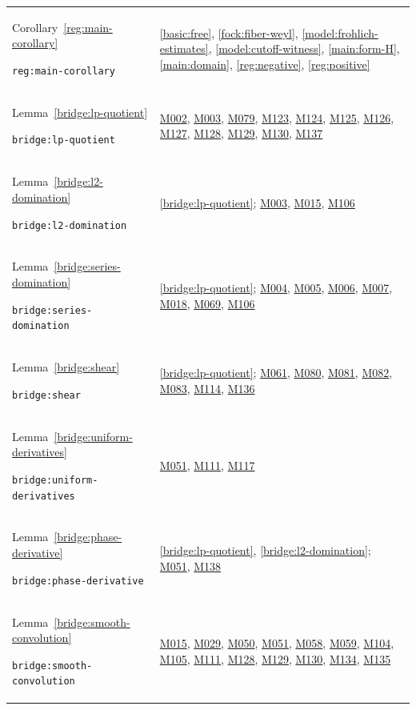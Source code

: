 \documentclass[11pt,a4paper]{article}
\theoremstyle{definition}
\theoremstyle{remark}
\begin{document}
\begin{longtable}{@{}p{}p{}@{}}
Corollary~\ref{reg:main-corollary}\par\nolinkurl{reg:main-corollary} & \ref{basic:free}, \ref{fock:fiber-weyl}, \ref{model:frohlich-estimates}, \ref{model:cutoff-witness}, \ref{main:form-H}, \ref{main:domain}, \ref{reg:negative}, \ref{reg:positive} \\[4pt]
Lemma~\ref{bridge:lp-quotient}\par\nolinkurl{bridge:lp-quotient} & \hyperref[base:M002]{M002}, \hyperref[base:M003]{M003}, \hyperref[base:M079]{M079}, \hyperref[base:M123]{M123}, \hyperref[base:M124]{M124}, \hyperref[base:M125]{M125}, \hyperref[base:M126]{M126}, \hyperref[base:M127]{M127}, \hyperref[base:M128]{M128}, \hyperref[base:M129]{M129}, \hyperref[base:M130]{M130}, \hyperref[base:M137]{M137} \\[4pt]
Lemma~\ref{bridge:l2-domination}\par\nolinkurl{bridge:l2-domination} & \ref{bridge:lp-quotient}; \hyperref[base:M003]{M003}, \hyperref[base:M015]{M015}, \hyperref[base:M106]{M106} \\[4pt]
Lemma~\ref{bridge:series-domination}\par\nolinkurl{bridge:series-domination} & \ref{bridge:lp-quotient}; \hyperref[base:M004]{M004}, \hyperref[base:M005]{M005}, \hyperref[base:M006]{M006}, \hyperref[base:M007]{M007}, \hyperref[base:M018]{M018}, \hyperref[base:M069]{M069}, \hyperref[base:M106]{M106} \\[4pt]
Lemma~\ref{bridge:shear}\par\nolinkurl{bridge:shear} & \ref{bridge:lp-quotient}; \hyperref[base:M061]{M061}, \hyperref[base:M080]{M080}, \hyperref[base:M081]{M081}, \hyperref[base:M082]{M082}, \hyperref[base:M083]{M083}, \hyperref[base:M114]{M114}, \hyperref[base:M136]{M136} \\[4pt]
Lemma~\ref{bridge:uniform-derivatives}\par\nolinkurl{bridge:uniform-derivatives} & \hyperref[base:M051]{M051}, \hyperref[base:M111]{M111}, \hyperref[base:M117]{M117} \\[4pt]
Lemma~\ref{bridge:phase-derivative}\par\nolinkurl{bridge:phase-derivative} & \ref{bridge:lp-quotient}, \ref{bridge:l2-domination}; \hyperref[base:M051]{M051}, \hyperref[base:M138]{M138} \\[4pt]
Lemma~\ref{bridge:smooth-convolution}\par\nolinkurl{bridge:smooth-convolution} & \hyperref[base:M015]{M015}, \hyperref[base:M029]{M029}, \hyperref[base:M050]{M050}, \hyperref[base:M051]{M051}, \hyperref[base:M058]{M058}, \hyperref[base:M059]{M059}, \hyperref[base:M104]{M104}, \hyperref[base:M105]{M105}, \hyperref[base:M111]{M111}, \hyperref[base:M128]{M128}, \hyperref[base:M129]{M129}, \hyperref[base:M130]{M130}, \hyperref[base:M134]{M134}, \hyperref[base:M135]{M135} \\[4pt]

\end{longtable}
\end{document}
